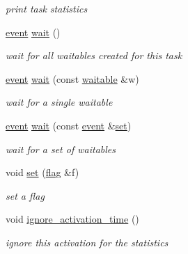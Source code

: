 \begin{DoxyCompactItemize}
\begin{DoxyCompactList}\small\item\em print task statistics \end{DoxyCompactList}\item 
\hyperlink{classrtos_1_1event}{event} \hyperlink{classrtos_1_1task__base_a32c6e19fe3d25a38587964defdb52ddc}{wait} ()
\begin{DoxyCompactList}\small\item\em wait for all waitables created for this task \end{DoxyCompactList}\item 
\hyperlink{classrtos_1_1event}{event} \hyperlink{classrtos_1_1task__base_a52035722f108687680966b87dd60bfe1}{wait} (const \hyperlink{classrtos_1_1waitable}{waitable} \&w)
\begin{DoxyCompactList}\small\item\em wait for a single waitable \end{DoxyCompactList}\item 
\hyperlink{classrtos_1_1event}{event} \hyperlink{classrtos_1_1task__base_a6acecfe733161a6258d39ed7a49275d0}{wait} (const \hyperlink{classrtos_1_1event}{event} \&\hyperlink{classrtos_1_1task__base_a1b3cb75ba2ef779cffc76b6076ecac39}{set})
\begin{DoxyCompactList}\small\item\em wait for a set of waitables \end{DoxyCompactList}\item 
void \hyperlink{classrtos_1_1task__base_a1b3cb75ba2ef779cffc76b6076ecac39}{set} (\hyperlink{classrtos_1_1flag}{flag} \&f)\hypertarget{classrtos_1_1task__base_a1b3cb75ba2ef779cffc76b6076ecac39}{}\label{classrtos_1_1task__base_a1b3cb75ba2ef779cffc76b6076ecac39}

\begin{DoxyCompactList}\small\item\em set a flag \end{DoxyCompactList}\item 
void \hyperlink{classrtos_1_1task__base_a257d2766179f2b15bf279cf040065472}{ignore\+\_\+activation\+\_\+time} ()
\begin{DoxyCompactList}\small\item\em ignore this activation for the statistics \end{DoxyCompactList}\end{DoxyCompactItemize}
